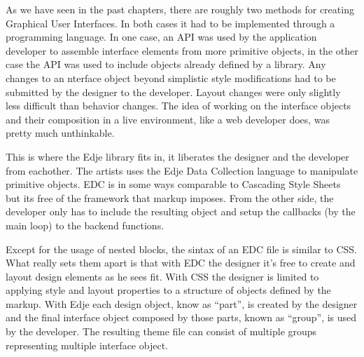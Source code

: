 \documentclass[12pt,a4paper,english]{book}
\begin{document}
As we have seen in the past chapters, there are roughly two methods for
creating Graphical User Interfaces. In both cases it had to be implemented
through a programming language. In one case, an API was used by the application
developer to assemble interface elements from more primitive objects, in the
other case the API was used to include objects already defined by a library.
Any changes to an nterface object beyond simplistic style modifications had to
be submitted by the designer to the developer. Layout changes were only
slightly less difficult than behavior changes. The idea of working on the
interface objects and their composition in a live environment, like a web
developer does, was pretty much unthinkable.

This is where the Edje library fits in, it liberates the designer and the
developer from eachother. The artists uses the Edje Data Collection language to
manipulate primitive objects. EDC is in some ways comparable to Cascading Style
Sheets but its free of the framework that markup imposes. From the other side,
the developer only has to include the resulting object and setup the callbacks
(by the main loop) to the backend functions.

{\hfill{}\hfill}

Except for the usage of nested blocks, the sintax of an EDC file is similar to
CSS. What really sets them apart is that with EDC the designer it's free to
create and layout design elements as he sees fit. With CSS the designer is
limited to applying style and layout properties to a structure of objects
defined by the markup. With Edje each design object, know as ``part'', is created
by the designer and the final interface object composed by those parts, known
as ``group'', is used by the developer. The resulting theme file can consist of
multiple groups representing multiple interface object.
\end{document}
